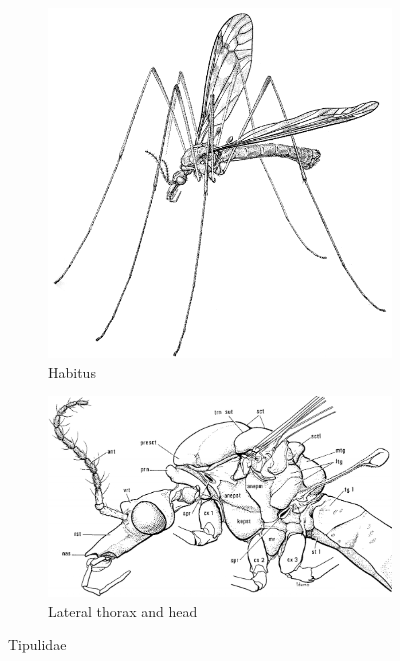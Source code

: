 \documentclass[letterpaper, 11pt]{article}
\begin{document}
\begin{figure}[ht!]
    \centering
    \begin{subfigure}[ht!]{0.4\textwidth}
        \includegraphics[width=\textwidth]{TipulidHabitus}
        \caption{Habitus \citep[][Fig. 7.1]{mcalpine1981manual}}
        \label{fig:tipulid1}
    \end{subfigure}
    \qquad 
    \begin{subfigure}[ht!]{0.45\textwidth}
        \includegraphics[width=\textwidth]{TipulidThorax}
        \caption{Lateral thorax and head \citep[][Fig. 7.2]{mcalpine1981manual}}
        \label{fig:tipulid2}
    \end{subfigure}
    \caption{Tipulidae}\label{fig:tipulids}
\end{figure}
\end{document}
